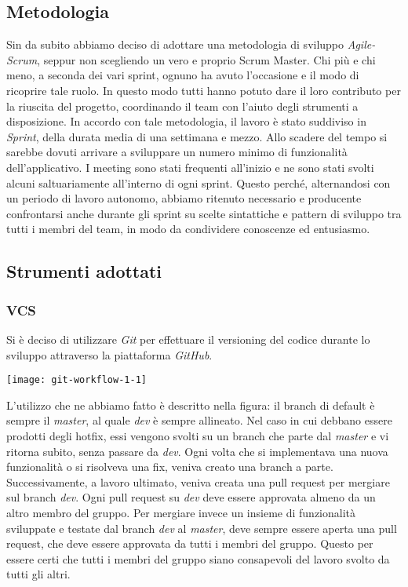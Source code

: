 \subsection{Metodologia}
Sin da subito abbiamo deciso di adottare una metodologia di sviluppo \textit{Agile-Scrum}, seppur non scegliendo un vero e proprio Scrum Master.
Chi più e chi meno, a seconda dei vari sprint, ognuno ha avuto l'occasione e il modo di ricoprire tale ruolo.
In questo modo tutti hanno potuto dare il loro contributo per la riuscita del progetto, coordinando il team con l'aiuto degli strumenti a disposizione.
In accordo con tale metodologia, il lavoro è stato suddiviso in \textit{Sprint}, della durata media di una settimana e mezzo.
Allo scadere del tempo si sarebbe dovuti arrivare a sviluppare un numero minimo di funzionalità dell'applicativo.
I meeting sono stati frequenti all'inizio e ne sono stati svolti alcuni saltuariamente all'interno di ogni sprint.
Questo perché, alternandosi con un periodo di lavoro autonomo, abbiamo ritenuto necessario e producente confrontarsi anche durante gli sprint su scelte sintattiche e pattern di sviluppo tra tutti i membri del team, in modo da condividere conoscenze ed entusiasmo.
\subsection{Strumenti adottati}
\subsubsection{VCS}
Si è deciso di utilizzare \textit{Git} per effettuare il versioning del codice durante lo sviluppo attraverso la piattaforma \textit{GitHub}.
\begin{center}
    \texttt{[image: git-workflow-1-1]}
\end{center}
L’utilizzo che ne abbiamo fatto è descritto nella figura: il branch di default è sempre il \textit{master}, al quale \textit{dev} è sempre allineato.
Nel caso in cui debbano essere prodotti degli hotfix, essi vengono svolti su un branch che parte dal \textit{master} e vi ritorna subito, senza passare da \textit{dev}.
Ogni volta che si implementava una nuova funzionalità o si risolveva una fix, veniva creato una branch a parte.
Successivamente, a lavoro ultimato, veniva creata una pull request per mergiare sul branch \textit{dev}.
Ogni pull request su \textit{dev} deve essere approvata almeno da un altro membro del gruppo.
Per mergiare invece un insieme di funzionalità sviluppate e testate dal branch \textit{dev} al \textit{master}, deve sempre essere aperta una pull request, che deve essere approvata da tutti i membri del gruppo.
Questo per essere certi che tutti i membri del gruppo siano consapevoli del lavoro svolto da tutti gli altri.

